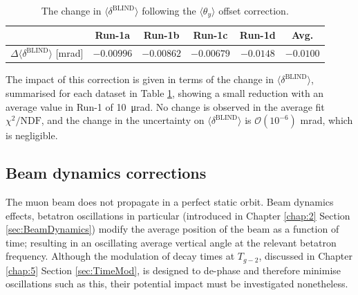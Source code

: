 \begin{table}[t!]
\centering{}
\begin{tabular}{l|ccccc}
\hline
\hline
 & Run-1a & Run-1b & Run-1c & Run-1d & Avg. \\ 
 \hline
$\Delta \langle \delta^{\text{BLIND}} \rangle $ [mrad] & $-0.00996$ & $-0.00862$ & $-0.00679$ & $-0.0148$ & $-0.0100$ \\ 
\hline
\hline
\end{tabular}
\caption{The change in $\langle \delta^{\text{BLIND}} \rangle$ following the $\langle \theta_{y} \rangle$ offset correction.}
\label{tbl:VertOffDiff}
\end{table}

The impact of this correction is given in terms of the change in $\langle \delta^{\text{BLIND}} \rangle$, summarised for each dataset in Table \ref{tbl:VertOffDiff}, showing a small reduction with an average value in Run-1 of \SI{10}{\micro\radian}. No change is observed in the average fit $\chi^{2}/\text{NDF}$, and the change in the uncertainty on $\langle \delta^{\text{BLIND}} \rangle$ is $\mathcal{O}(10^{-6})$ mrad, which is negligible. 





\subsection{Beam dynamics corrections}\label{subsec:BeamDynamicsCorr}
 
The muon beam does not propagate in a perfect static orbit. Beam dynamics effects, betatron oscillations in particular (introduced in Chapter \ref{chap:2} Section \ref{sec:BeamDynamics}) modify the average position of the beam as a function of time; resulting in an oscillating average vertical angle at the relevant betatron frequency. Although the modulation of decay times at $T_{g-2}$, discussed in Chapter \ref{chap:5} Section \ref{sec:TimeMod}, is designed to de-phase and therefore minimise oscillations such as this, their potential impact must be investigated nonetheless.

